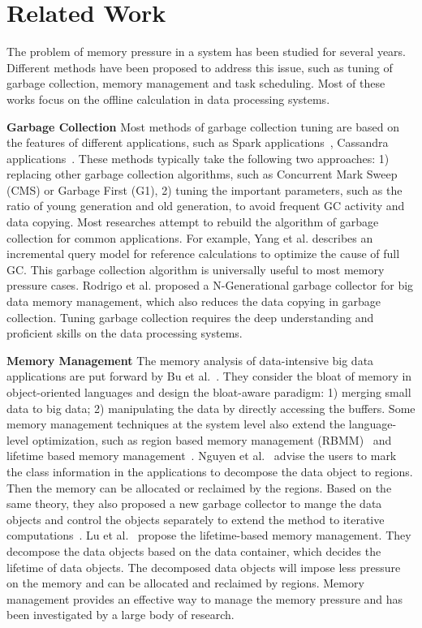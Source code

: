\section{Related Work}

The problem of memory pressure in a system has been studied for several years. Different methods have been proposed to address this issue, such as tuning of garbage collection, memory management and task scheduling. Most of these works focus on the offline calculation in data processing systems. 

\textbf{Garbage Collection} Most methods of garbage collection tuning are based on the features of different applications, such as Spark applications~\cite{www:spark-tuning}, Cassandra applications~\cite{www:cassandra}. These methods typically take the following two approaches: 1) replacing other garbage collection algorithms, such as Concurrent Mark Sweep (CMS) or Garbage First (G1), 2) tuning the important parameters, such as the ratio of young generation and old generation, to avoid frequent GC activity and data copying. Most researches attempt to rebuild the algorithm of garbage collection for common applications. For example, Yang et al.\cite{yang:fullgc} describes an incremental query model for reference calculations to optimize the cause of full GC. This garbage collection algorithm is universally useful to most memory pressure cases. Rodrigo et al.\cite{rodigo:NGeneration} proposed a N-Generational garbage collector for big data memory management, which also reduces the data copying in garbage collection. Tuning garbage collection requires the deep understanding and proficient skills on the data processing systems. 

\textbf{Memory Management} The memory analysis of data-intensive big data applications are put forward by Bu et al.~\cite{bu:bloat}. They consider the bloat of memory in object-oriented languages and design the bloat-aware paradigm: 1) merging small data to big data; 2) manipulating the data by directly accessing the buffers. Some memory management techniques at the system level also extend the language-level optimization, such as region based memory management (RBMM)~\cite{nguyen2015facade, nguyen:yak} and lifetime based memory management~\cite{lulu:deca}. Nguyen et al.~\cite{nguyen2015facade} advise the users to mark the class information in the applications to decompose the data object to regions. Then the memory can be allocated or reclaimed by the regions. Based on the same theory, they also proposed a new garbage collector to mange the data objects and control the objects separately to extend the method to iterative computations~\cite{nguyen:yak}. Lu et al.~\cite{lulu:deca} propose the lifetime-based memory management. They decompose the data objects based on the data container, which decides the lifetime of data objects. The decomposed data objects will impose less pressure on the memory and can be allocated and reclaimed by regions. Memory management provides an effective way to manage the memory pressure and has been investigated by a large body of research.

